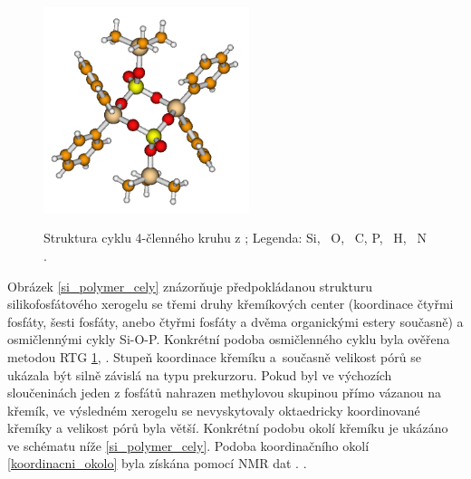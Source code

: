 \documentclass[
digital, %
table,   %
lof,     %
lot,     %
oneside,
]{fithesis3}
\begin{document}
\begin{figure}
\caption{Struktura cyklu 4-členného kruhu z \cite{C4TA06823H};  Legenda:  Si, ~O, ~C,  P, ~H, ~N .}
\center \includegraphics[width=6cm]{rtg_kruh_samostatne.png} \label{rtg_cyklus} \end{figure}
Obrázek \ref{si_polymer_cely} znázorňuje předpokládanou strukturu silikofosfátového xerogelu se třemi druhy křemíkových center (koordinace čtyřmi fosfáty, šesti fosfáty, anebo čtyřmi fosfáty a dvěma organickými estery současně) a osmičlennými cykly Si-O-P.  Konkrétní podoba osmičlenného cyklu byla ověřena metodou RTG \ref{rtg_cyklus}, \cite{C4TA06823H}. Stupeň koordinace křemíku a~současně velikost pórů se ukázala být silně závislá na typu prekurzoru. Pokud byl ve výchozích sloučeninách jeden z fosfátů nahrazen methylovou skupinou přímo vázanou na křemík, ve výsledném xerogelu se nevyskytovaly oktaedricky koordinované křemíky a velikost pórů byla větší. Konkrétní podobu okolí křemíku je ukázáno ve schématu níže \ref{si_polymer_cely}. Podoba koordinačního okolí \ref{koordinacni_okolo} byla získána pomocí NMR dat \cite{C4TA06823H}. \cite{Styskalik2015thesis}.
\end{document}
